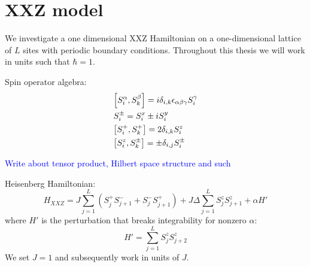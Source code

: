 \chapter{XXZ model}
\thispagestyle{chapterBeginStyle}

We investigate a one dimensional XXZ Hamiltonian on a one-dimensional lattice of \(L\) sites with periodic boundary conditions.
Throughout this thesis we will work in units such that \(\hbar = 1\).

Spin operator algebra:
\begin{align*}
    &\comm{S_{i}^{\alpha}}{S_{k}^{\beta}} = i  \delta_{i,k}\epsilon_{\alpha \beta \gamma} S_{i}^{\gamma}\\
    &S_{i}^{\pm} = \Sx_i \pm i \Sy_i\\
    &\comm{\Sp_i}{\Sp_k} = 2 \delta_{i,k} \Sz_i \\
    &\comm{\Sz_i}{S^{\pm}_k} = \pm \delta_{i,j} S_{i}^{\pm}
\end{align*}

\textcolor{blue}{Write about tensor product, Hilbert space structure and such}

\noindent Heisenberg Hamiltonian:
\begin{equation}
    H_{XXZ} = J\sum_{j = 1}^{L}\left( S^{+}_{j} S^{-}_{j+1} + S^{-}_{j}S^{+}_{j+1} \right) + J\Delta\sum_{j = 1}^{L} S^{z}_{j}S^{z}_{j+1}
    + \alpha H'
    \label{eq:HXXZ}
\end{equation}
where \(H'\) is the perturbation that breaks integrability for nonzero \(\alpha\):
\begin{equation}
    H'=\sum_{j = 1}^{L} S^{z}_{j}S^{z}_{j+2}
\end{equation}
We set \(J = 1\) and subsequently work in units of \(J\).